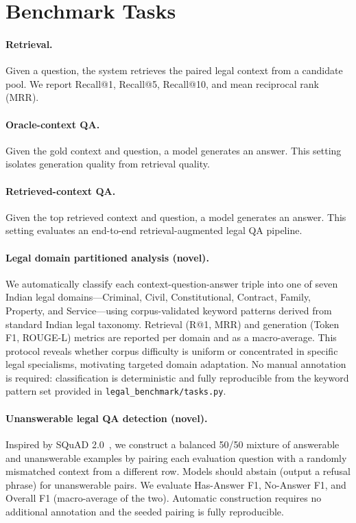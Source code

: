 \documentclass{article}
\begin{document}
\section{Benchmark Tasks}

\paragraph{Retrieval.}
Given a question, the system retrieves the paired legal context from a candidate pool. We report Recall@1, Recall@5, Recall@10, and mean reciprocal rank (MRR).

\paragraph{Oracle-context QA.}
Given the gold context and question, a model generates an answer. This setting isolates generation quality from retrieval quality.

\paragraph{Retrieved-context QA.}
Given the top retrieved context and question, a model generates an answer. This setting evaluates an end-to-end retrieval-augmented legal QA pipeline.

\paragraph{Legal domain partitioned analysis (novel).}
We automatically classify each context-question-answer triple into one of seven Indian legal domains---Criminal, Civil, Constitutional, Contract, Family, Property, and Service---using corpus-validated keyword patterns derived from standard Indian legal taxonomy. Retrieval (R@1, MRR) and generation (Token F1, ROUGE-L) metrics are reported per domain and as a macro-average. This protocol reveals whether corpus difficulty is uniform or concentrated in specific legal specialisms, motivating targeted domain adaptation. No manual annotation is required: classification is deterministic and fully reproducible from the keyword pattern set provided in \texttt{legal\_benchmark/tasks.py}.

\paragraph{Unanswerable legal QA detection (novel).}
Inspired by SQuAD 2.0~\citep{rajpurkar2018know}, we construct a balanced 50/50 mixture of answerable and unanswerable examples by pairing each evaluation question with a randomly mismatched context from a different row. Models should abstain (output a refusal phrase) for unanswerable pairs. We evaluate Has-Answer F1, No-Answer F1, and Overall F1 (macro-average of the two). Automatic construction requires no additional annotation and the seeded pairing is fully reproducible.
\end{document}
